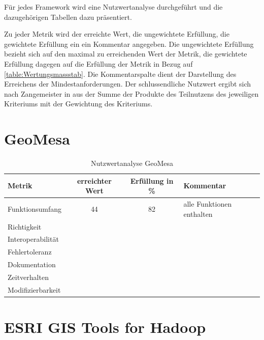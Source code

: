 Für jedes Framework wird eine Nutzwertanalyse durchgeführt und die dazugehörigen Tabellen dazu präsentiert.

Zu jeder Metrik wird der erreichte Wert, die ungewichtete Erfüllung, die gewichtete Erfüllung ein ein Kommentar angegeben.
Die ungewichtete Erfüllung bezieht sich auf den maximal zu erreichenden Wert der Metrik, die gewichtete Erfüllung dagegen auf die Erfüllung der Metrik in Bezug auf \ref{table:Wertungsmassstab}.
Die Kommentarspalte dient der Darstellung des Erreichens der Mindestanforderungen.
Der schlussendliche Nutzwert ergibt sich nach Zangemeister in \cite{website:nutzwertanalyse} aus der Summe der Produkte des Teilnutzens des jeweiligen Kriteriums mit der Gewichtung des Kriteriums.

\section{GeoMesa}

\begin{table}[htp]
\centering
\small
\begin{tabular}{l|c|c|p{3cm}}
\textbf{Metrik} & \textbf{erreichter Wert} & \textbf{Erfüllung in \%} & \textbf{Kommentar} \\ \hline
Funktionsumfang & 44 & 82 & alle Funktionen enthalten \\ \hline
Richtigkeit &  &  &  \\ \hline
Interoperabilität &  &  &  \\ \hline
Fehlertoleranz &  &  &  \\ \hline
Dokumentation &  &  &  \\ \hline
Zeitverhalten &  &  &  \\ \hline
Modifizierbarkeit &  &  &  \\
\end{tabular}
\caption{Nutzwertanalyse GeoMesa}
\label{table:nutzwertanalyse-geomesa}
\end{table}



\section{ESRI GIS Tools for Hadoop}

